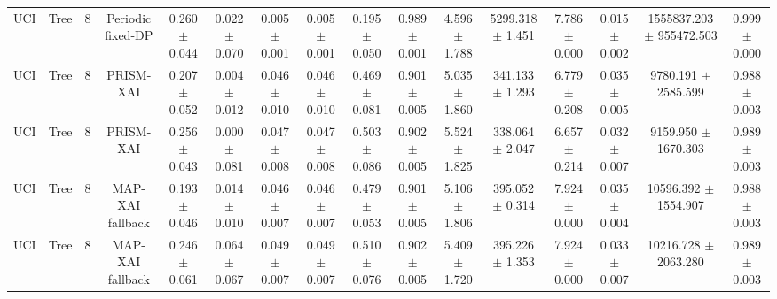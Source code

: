 \begin{tabular}{lccccccccccccccc}
UCI & Tree & 8 & Periodic fixed-DP & 0.260 $\pm$ 0.044 & 0.022 $\pm$ 0.070 & 0.005 $\pm$ 0.001 & 0.005 $\pm$ 0.001 & 0.195 $\pm$ 0.050 & 0.989 $\pm$ 0.001 & 4.596 $\pm$ 1.788 & 5299.318 $\pm$ 1.451 & 7.786 $\pm$ 0.000 & 0.015 $\pm$ 0.002 & 1555837.203 $\pm$ 955472.503 & 0.999 $\pm$ 0.000 \\
UCI & Tree & 8 & PRISM-XAI & 0.207 $\pm$ 0.052 & 0.004 $\pm$ 0.012 & 0.046 $\pm$ 0.010 & 0.046 $\pm$ 0.010 & 0.469 $\pm$ 0.081 & 0.901 $\pm$ 0.005 & 5.035 $\pm$ 1.860 & 341.133 $\pm$ 1.293 & 6.779 $\pm$ 0.208 & 0.035 $\pm$ 0.005 & 9780.191 $\pm$ 2585.599 & 0.988 $\pm$ 0.003 \\
UCI & Tree & 8 & PRISM-XAI & 0.256 $\pm$ 0.043 & 0.000 $\pm$ 0.081 & 0.047 $\pm$ 0.008 & 0.047 $\pm$ 0.008 & 0.503 $\pm$ 0.086 & 0.902 $\pm$ 0.005 & 5.524 $\pm$ 1.825 & 338.064 $\pm$ 2.047 & 6.657 $\pm$ 0.214 & 0.032 $\pm$ 0.007 & 9159.950 $\pm$ 1670.303 & 0.989 $\pm$ 0.003 \\
UCI & Tree & 8 & MAP-XAI fallback & 0.193 $\pm$ 0.046 & 0.014 $\pm$ 0.010 & 0.046 $\pm$ 0.007 & 0.046 $\pm$ 0.007 & 0.479 $\pm$ 0.053 & 0.901 $\pm$ 0.005 & 5.106 $\pm$ 1.806 & 395.052 $\pm$ 0.314 & 7.924 $\pm$ 0.000 & 0.035 $\pm$ 0.004 & 10596.392 $\pm$ 1554.907 & 0.988 $\pm$ 0.003 \\
UCI & Tree & 8 & MAP-XAI fallback & 0.246 $\pm$ 0.061 & 0.064 $\pm$ 0.067 & 0.049 $\pm$ 0.007 & 0.049 $\pm$ 0.007 & 0.510 $\pm$ 0.076 & 0.902 $\pm$ 0.005 & 5.409 $\pm$ 1.720 & 395.226 $\pm$ 1.353 & 7.924 $\pm$ 0.000 & 0.033 $\pm$ 0.007 & 10216.728 $\pm$ 2063.280 & 0.989 $\pm$ 0.003 \\
\bottomrule
\end{tabular}
